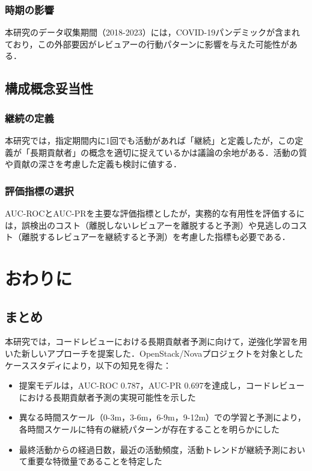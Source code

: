 \subsubsection{時期の影響}
本研究のデータ収集期間（2018-2023）には，COVID-19パンデミックが含まれており，この外部要因がレビュアーの行動パターンに影響を与えた可能性がある．

\subsection{構成概念妥当性}

\subsubsection{継続の定義}
本研究では，指定期間内に1回でも活動があれば「継続」と定義したが，この定義が「長期貢献者」の概念を適切に捉えているかは議論の余地がある．活動の質や貢献の深さを考慮した定義も検討に値する．

\subsubsection{評価指標の選択}
AUC-ROCとAUC-PRを主要な評価指標としたが，実務的な有用性を評価するには，誤検出のコスト（離脱しないレビュアーを離脱すると予測）や見逃しのコスト（離脱するレビュアーを継続すると予測）を考慮した指標も必要である．

\section{おわりに}
\label{sec:conclusion}

\subsection{まとめ}
本研究では，コードレビューにおける長期貢献者予測に向けて，逆強化学習を用いた新しいアプローチを提案した．OpenStack/Novaプロジェクトを対象としたケーススタディにより，以下の知見を得た：

\begin{itemize}
    \item 提案モデルは，AUC-ROC 0.787，AUC-PR 0.697を達成し，コードレビューにおける長期貢献者予測の実現可能性を示した
    \item 異なる時間スケール（0-3m，3-6m，6-9m，9-12m）での学習と予測により，各時間スケールに特有の継続パターンが存在することを明らかにした
    \item 最終活動からの経過日数，最近の活動頻度，活動トレンドが継続予測において重要な特徴量であることを特定した
\end{itemize}

